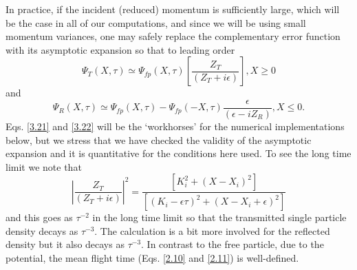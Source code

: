 \documentclass[preprint,aps]{revtex4}
\begin{document}
In practice, if the incident (reduced) momentum is sufficiently large, which
will be the case in all of our computations, and since we will be using small
momentum variances, one may safely replace the complementary error function
with its asymptotic expansion so that to leading order
\begin{equation}
\Psi _{T}\left( X,\tau \right) \simeq \Psi _{fp}\left( X,\tau \right) \left[
\frac{Z_{T}}{\left( Z_{T}+i\epsilon \right) }\right] ,X\geq 0  \label{3.21}
\end{equation}%
and
\begin{equation}
\Psi _{R}\left( X,\tau \right) \simeq \Psi _{fp}\left( X,\tau \right) -\Psi
_{fp}\left( -X,\tau \right) \frac{\epsilon }{\left( \epsilon -iZ_{R}\right) }%
,X\leq 0.  \label{3.22}
\end{equation}%
Eqs. \ref{3.21} and \ref{3.22} will be the `workhorses' for the numerical
implementations below, but we stress that we have checked the validity of the
asymptotic expansion and it is quantitative for the conditions here used. To
see the long time limit we note that
\begin{equation}
\left\vert \frac{Z_{T}}{\left( Z_{T}+i\epsilon \right) }\right\vert ^{2}=%
\frac{\left[ K_{i}^{2}+\left( X-X_{i}\right) ^{2}\right] }{\left[ \left(
K_{i}-\epsilon \tau \right) ^{2}+\left( X-X_{i}+\epsilon \right) ^{2}\right]
}  \label{3.23}
\end{equation}
and this goes as $\tau ^{-2}$ in the long time limit so that the transmitted
single particle density decays as $\tau ^{-3}$. The calculation is a bit
more involved for the reflected density but it also decays as $\tau ^{-3}$.
In contrast to the free particle, due to the potential, the mean flight time
(Eqs. \ref{2.10} and \ref{2.11}) is well-defined.
\end{document}
